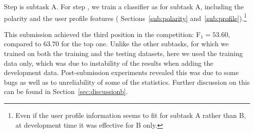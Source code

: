 Step \Ni is subtask A. For step \Nii, we train a classifier as for subtask A, 
including the polarity and the user profile features (\cf 
Sections~\ref{sub:polarity} and~\ref{sub:profile}).\footnote{Even if the user profile information seems to fit for subtask A 
rather than B, at development time it was effective for B only.}

This submission achieved the third position in the competition:
F$_1=53.60$, compared to $63.70$ for the top one. 
Unlike the other subtasks, for which we trained on both the training and the testing datasets,
here we used the training data only, which was due to instability of the results
when adding the development data.
Post-submission experiments
revealed this was due to some bugs as well as to unreliability of some of the statistics.
Further discussion on this can be found in Section~\ref{sec:discussionb}.


